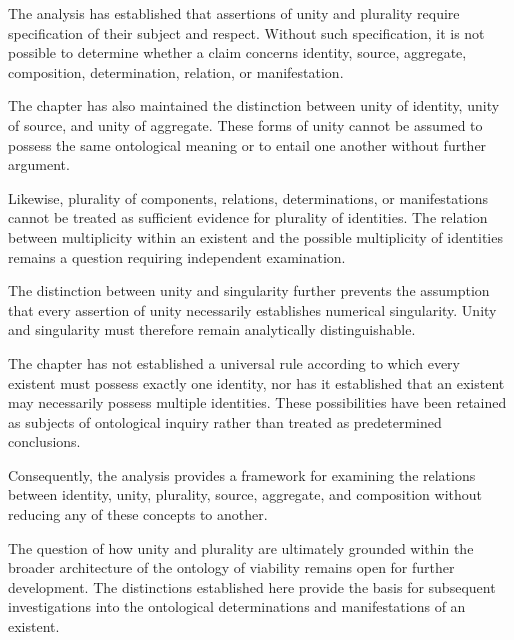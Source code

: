 The analysis has established that assertions of unity
and plurality require specification of their subject
and respect. Without such specification, it is not
possible to determine whether a claim concerns identity,
source, aggregate, composition, determination, relation,
or manifestation.

The chapter has also maintained the distinction between
unity of identity, unity of source, and unity of aggregate.
These forms of unity cannot be assumed to possess the
same ontological meaning or to entail one another
without further argument.

Likewise, plurality of components, relations, determinations,
or manifestations cannot be treated as sufficient evidence
for plurality of identities. The relation between
multiplicity within an existent and the possible
multiplicity of identities remains a question requiring
independent examination.

The distinction between unity and singularity further
prevents the assumption that every assertion of unity
necessarily establishes numerical singularity. Unity
and singularity must therefore remain analytically
distinguishable.

The chapter has not established a universal rule according
to which every existent must possess exactly one identity,
nor has it established that an existent may necessarily
possess multiple identities. These possibilities have
been retained as subjects of ontological inquiry rather
than treated as predetermined conclusions.

Consequently, the analysis provides a framework for
examining the relations between identity, unity, plurality,
source, aggregate, and composition without reducing
any of these concepts to another.

The question of how unity and plurality are ultimately
grounded within the broader architecture of the ontology
of viability remains open for further development.
The distinctions established here provide the basis
for subsequent investigations into the ontological
determinations and manifestations of an existent.

